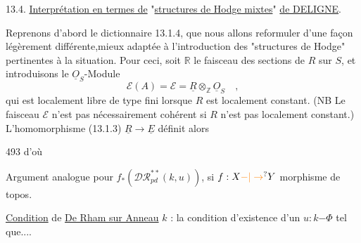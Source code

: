 13.4. \uline{Interprétation en termes de} "\uline{structures de Hodge mixtes}" \uline{de DELIGNE}.

Reprenons d'abord le dictionnaire 13.1.4, que nous allons reformuler d'une façon légèrement différente,mieux adaptée à l'introduction des "structures de Hodge" pertinentes à la situation. Pour ceci, soit $\mathbb R$ le faisceau des sections de $R$ sur $S$, et introduisons le $\underline{O}_S$-Module
\[
\mathscr E(A)=\mathscr E=\underline R\otimes_{\mathbb Z}\underline O_S\quad , \tag*{(13.4.1)}
\]
qui est localement libre de type fini lorsque $R$ est localement constant. (NB Le faisceau $\mathscr E$ n'est pas nécessairement cohérent si $R$ n'est pas localement constant.) L'homomorphisme (13.1.3) $\underline R\longrightarrow\underline E$ définit alors

493
d'où

Argument analogue pour $f_*(\mathscr{DR}^{**}_{pd}(k,u))$, si $f:X\unsure{\mathord{-}|\to}Y$ morphisme de topos.

\uline{Condition} de \uline{De Rham sur Anneau} $k$ : la condition d'existence d'un $u:k\mathord{-}\Phi$ tel que....

